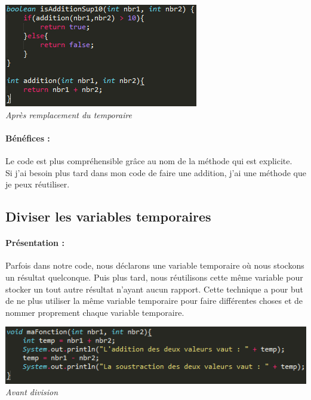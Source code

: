 \documentclass[a4paper,twoside,12pt,openright]{report}
\begin{document}
\begin{center}
\includegraphics[scale=1]{Image/Remplacement_Temp_Methode2.png}\\
\itshape{Après remplacement du temporaire}
\end{center}

\paragraph{Bénéfices :}
Le code est plus compréhensible grâce au nom de la méthode qui est explicite.\\
Si j'ai besoin plus tard dans mon code de faire une addition, j'ai une méthode que je peux réutiliser.

\newpage

\subsection{Diviser les variables temporaires}
\paragraph{Présentation :}
Parfois dans notre code, nous déclarons une variable temporaire où nous stockons un résultat quelconque. Puis plus tard, nous réutilisons cette même variable pour stocker un tout autre résultat n'ayant aucun rapport.
Cette technique a pour but de ne plus utiliser la même variable temporaire pour faire différentes choses et de nommer proprement chaque variable temporaire.

\begin{center}
\includegraphics[scale=1]{Image/Diviser_Temp.png}\\
\itshape{Avant division}
\end{center}
\end{document}
